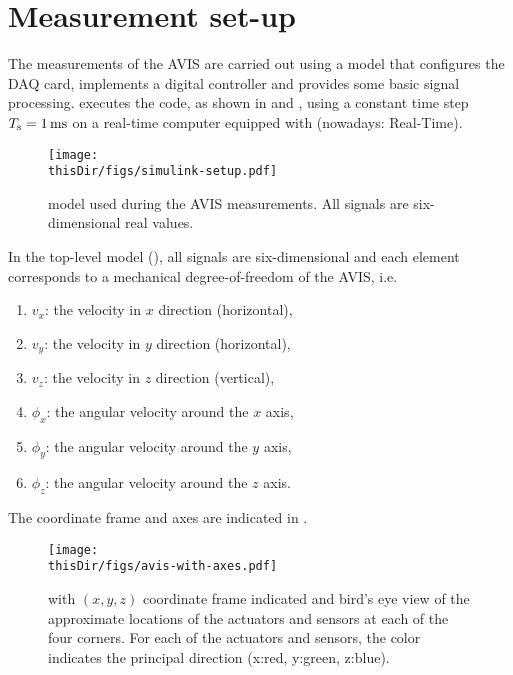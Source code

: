 
\section{ Measurement set-up}
\label{app:avis-setup}
The measurements of the \gls{AVIS} are carried out using a \Simulink model that configures the \gls{DAQ} card, implements a digital controller and provides some basic signal processing.
\Simulink executes the code, as shown in  and ,  using a constant time step $T_{\mathrm{s}} = 1\,\mathrm{ms}$ on a real-time computer equipped with  (nowadays: \Simulink Real-Time).

\begin{figure}
\setlength\figurewidth{\columnwidth}
  \texttt{[image: \\thisDir/figs/simulink-setup.pdf]}
  \caption[\Simulink model used on the ]{\Simulink model used during the AVIS measurements. All signals are six-dimensional real values.}
  \label{fig:avis:simulink:setup}
\end{figure}

In the top-level model (), all signals are six-dimensional and each element corresponds to a mechanical degree-of-freedom of the \gls{AVIS}, i.e. 
\begin{enumerate}
  \item $v_x$: the velocity in $x$ direction (horizontal),
  \item $v_y$: the velocity in $y$ direction (horizontal),
  \item $v_z$: the velocity in $z$ direction (vertical),
  \item $\phi_x$: the angular velocity around the $x$ axis,
  \item $\phi_y$: the angular velocity around the $y$ axis,
  \item $\phi_z$: the angular velocity around the $z$ axis.
\end{enumerate}
The coordinate frame and axes are indicated in .

\begin{figure}
  \centering
  \texttt{[image: \\thisDir/figs/avis-with-axes.pdf]}
  \caption[ with coordinate frame, sensors and actuators.]{ with $(x,y,z)$ coordinate frame indicated and bird's eye view of the approximate locations of the actuators and sensors at each of the four corners. For each of the actuators and sensors, the color indicates the principal direction (x:red, y:green, z:blue).}
  \label{fig:avis:withAxes}
\end{figure}

